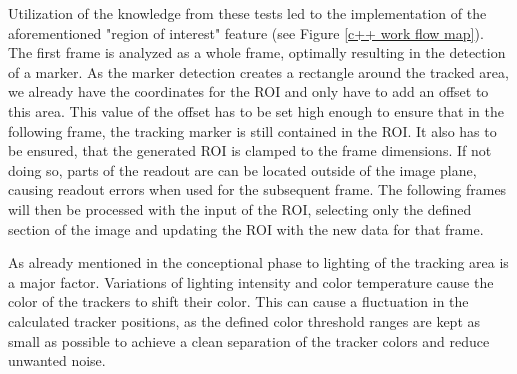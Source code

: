 Utilization of the knowledge from these tests led to the implementation of the aforementioned "region of interest" feature (see Figure \ref{c++ work flow map}).
The first frame is analyzed as a whole frame, optimally resulting in the detection of a marker. As the marker detection creates a rectangle around the tracked area, we already have the coordinates for the ROI and only have to add an offset to this area. This value of the offset has to be set high enough to ensure that in the following frame, the tracking marker is still contained in the ROI. It also has to be ensured, that the generated ROI is clamped to the frame dimensions. If not doing so, parts of the readout are can be located outside of the image plane, causing readout errors when used for the subsequent frame. The following frames will then be processed with the input of the ROI, selecting only the defined section of the image and updating the ROI with the new data for that frame.

As already mentioned in the conceptional phase to lighting of the tracking area is a major factor. Variations of lighting intensity and color temperature cause the color of the trackers to shift their color. This can cause a fluctuation in the calculated tracker positions, as the defined color threshold ranges are kept as small as possible to achieve a clean separation of the tracker colors and reduce unwanted noise. 





